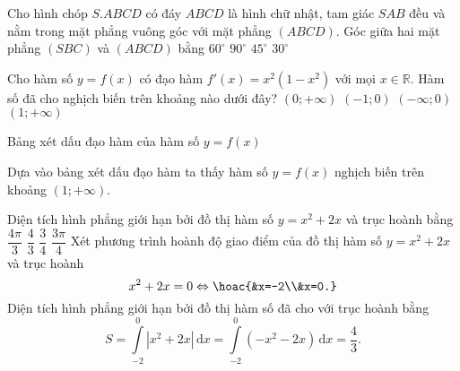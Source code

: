 \begin{ex}%
Cho hình chóp $S.ABCD$ có đáy $ABCD$ là hình chữ nhật, tam giác $SAB$ đều và nằm trong mặt phẳng vuông góc với mặt phẳng $(ABCD)$. Góc giữa hai mặt phẳng $(SBC)$ và $(ABCD)$ bằng
\choice
{\True $60^{\circ}$}
{$90^{\circ}$}
{$45^{\circ}$}
{$30^{\circ}$}
\loigiai
{
{
}
}
\end{ex}

\begin{ex}%
Cho hàm số $y=f(x)$ có đạo hàm $f'(x)=x^2(1-x^2)$ với mọi $x\in\mathbb{R}$. Hàm số đã cho nghịch biến trên khoảng nào dưới đây?
\choice
{$(0;+\infty)$}
{$(-1;0)$}
{$(-\infty;0)$}
{\True $(1;+\infty)$}
\loigiai
{Bảng xét dấu đạo hàm của hàm số $y=f(x)$
\begin{center}
\end{center}
Dựa vào bảng xét dấu đạo hàm ta thấy hàm số $y=f(x)$ nghịch biến trên khoảng $(1;+\infty)$.
}
\end{ex}

\begin{ex}%
Diện tích hình phẳng giới hạn bởi đồ thị hàm số $y=x^2+2x$ và trục hoành bằng
\choice
{$\dfrac{4\pi}{3}$}
{\True $\dfrac{4}{3}$}
{$\dfrac{3}{4}$}
{$\dfrac{3\pi}{4}$}
\loigiai
{Xét phương trình hoành độ giao điểm của đồ thị hàm số $y=x^2+2x$ và trục hoành 
$$x^2+2x=0\Leftrightarrow\hoac{&x=-2\\&x=0.}$$
Diện tích hình phẳng giới hạn bởi đồ thị hàm số đã cho với trục hoành bằng
\[S=\displaystyle\int\limits_{-2}^0|x^2+2x|\mathrm{\,d}x=\displaystyle\int\limits_{-2}^0(-x^2-2x)\mathrm{\,d}x=\dfrac{4}{3}.\]
}
\end{ex}

